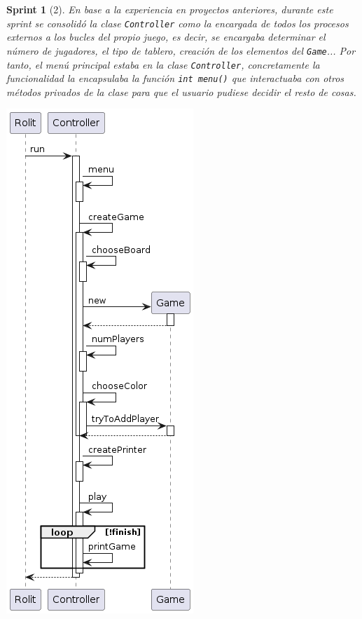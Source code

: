\documentclass{article}
\theoremstyle{break}
\newtheorem*{sprint}{Sprint}
\begin{document}
\begin{sprint}[2]
En base a la experiencia en proyectos anteriores, durante este sprint se consolidó la clase \texttt{Controller} como la encargada de todos los procesos externos a los bucles del propio juego, es decir, se encargaba determinar el número de jugadores, el tipo de tablero, creación de los elementos del \texttt{Game}... Por tanto, el menú principal estaba en la clase \texttt{Controller}, concretamente la funcionalidad la encapsulaba la función \texttt{int menu()} que interactuaba con otros métodos privados de la clase para que el usuario pudiese decidir el resto de cosas.

\begin{center}
\includegraphics[scale=0.5]{MenuPpal_sprint2_seq}
\end{center}
\end{sprint}
\end{document}
